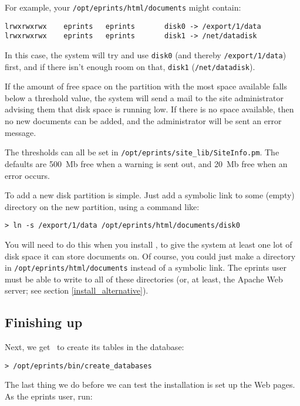 For example, your {\tt /opt/eprints/html/documents} might contain:

\begin{verbatim}
lrwxrwxrwx    eprints   eprints       disk0 -> /export/1/data
lrwxrwxrwx    eprints   eprints       disk1 -> /net/datadisk
\end{verbatim}

In this case, the system will try and use {\tt disk0} (and thereby {\tt /export/1/data}) first, and if there isn't enough room on that, {\tt disk1} ({\tt /net/datadisk}).

If the amount of free space on the partition with the most space available falls below a threshold value, the system will send a mail to the site administrator advising them that disk space is running low. If there is no space available, then no new documents can be added, and the administrator will be sent an error message.

The thresholds can all be set in {\tt /opt/eprints/site\_lib/SiteInfo.pm}. The defaults are 500~Mb free when a warning is sent out, and 20~Mb free when an error occurs.

To add a new disk partition is simple. Just add a symbolic link to some (empty) directory on the new partition, using a command like:

\begin{verbatim}
> ln -s /export/1/data /opt/eprints/html/documents/disk0
\end{verbatim}

You will need to do this when you install \eprints, to give the system at least one lot of disk space it can store documents on. Of course, you could just make a directory in {\tt /opt/eprints/html/documents} instead of a symbolic link. The eprints user must be able to write to all of these directories (or, at least, the Apache Web server; see section \ref{install_alternative}).


\subsection{Finishing up}

Next, we get \eprints\ to create its tables in the database:

\begin{verbatim}
> /opt/eprints/bin/create_databases
\end{verbatim}

The last thing we do before we can test the installation is set up the Web pages. As the eprints user, run:

